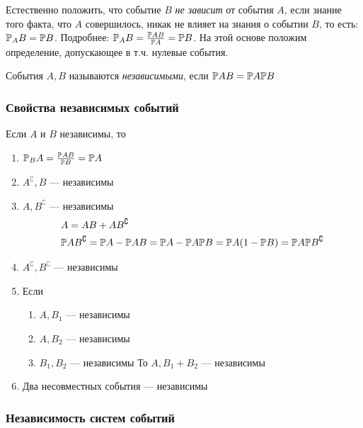 Естественно положить, что событие \(B\) \emph{не зависит} от события
\(A\), если знание того факта, что \(A\) совершилось, никак не влияет на
знания о событии \(B\), то есть: \(\mathbb P_A B = \mathbb P B\). Подробнее:
\(\mathbb P_A B = \frac{\mathbb P AB}{\mathbb P A} = \mathbb P B\). На этой основе положим
определение, допускающее в т.ч. нулевые события.

События \(A, B\) называются \emph{независимыми}, если
\(\mathbb P AB = \mathbb P A \mathbb P B\)

\subsubsection{Свойства независимых
событий}\label{ux441ux432ux43eux439ux441ux442ux432ux430-ux43dux435ux437ux430ux432ux438ux441ux438ux43cux44bux445-ux441ux43eux431ux44bux442ux438ux439}

Если \(A\) и \(B\) независимы, то

\begin{enumerate}
\def\labelenumi{\arabic{enumi}.}

\item
  \(\mathbb P_B A = \frac{\mathbb P AB}{\mathbb P B} = \mathbb P A\)
\item
  \(A^\complement, B\) --- независимы
\item
  \(A, B^\complement\) --- независимы \[\begin{aligned}
  & A = AB + AB^\complement \\
  & \mathbb P AB^\complement = \mathbb P A - \mathbb P AB = \mathbb P A - \mathbb P A \mathbb P B = \mathbb P A (1 - \mathbb P B) = \mathbb P A \mathbb P B^\complement
  \end{aligned}\]
\item
  \(A^\complement, B^\complement\) --- независимы
\item
  Если

  \begin{enumerate}
  \def\labelenumii{\arabic{enumii}.}
  
  \item
    \(A, B_1\) --- независимы
  \item
    \(A, B_2\) --- независимы
  \item
    \(B_1, B_2\) --- независимы То \(A, B_1+B_2\) --- независимы
  \end{enumerate}
\item
  Два несовместных события --- независимы
\end{enumerate}

\subsubsection{Независимость систем
событий}\label{ux43dux435ux437ux430ux432ux438ux441ux438ux43cux43eux441ux442ux44c-ux441ux438ux441ux442ux435ux43c-ux441ux43eux431ux44bux442ux438ux439}

